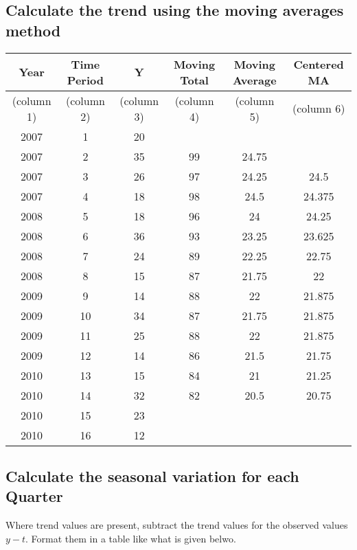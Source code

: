 \documentclass[a4paper,12pt]{article}
\begin{document}
\subsection*{Calculate the trend using the moving averages method}

\begin{tabular}{|c|c|c|c|c|c|} 
	\hline
	Year	&	Time Period	&	Y	&	Moving Total	&	Moving Average	&	Centered MA	\\	\hline
	(column 1)	&	(column 2)	&	(column 3)	&	(column 4)	&	(column 5)	&	(column 6)	\\	\hline
	2007	&	1	&	20	&		&		&		\\	\hline
	2007	&	2	&	35	&	99	&	24.75	&		\\	\hline
	2007	&	3	&	26	&	97	&	24.25	&	24.5	\\	\hline
	2007	&	4	&	18	&	98	&	24.5	&	24.375	\\	\hline
	2008	&	5	&	18	&	96	&	24	&	24.25	\\	\hline
	2008	&	6	&	36	&	93	&	23.25	&	23.625	\\	\hline
	2008	&	7	&	24	&	89	&	22.25	&	22.75	\\	\hline
	2008	&	8	&	15	&	87	&	21.75	&	22	\\	\hline
	2009	&	9	&	14	&	88	&	22	&	21.875	\\	\hline
	2009	&	10	&	34	&	87	&	21.75	&	21.875	\\	\hline
	2009	&	11	&	25	&	88	&	22	&	21.875	\\	\hline
	2009	&	12	&	14	&	86	&	21.5	&	21.75	\\	\hline
	2010	&	13	&	15	&	84	&	21	&	21.25	\\	\hline
	2010	&	14	&	32	&	82	&	20.5	&	20.75	\\	\hline
	2010	&	15	&	23	&		&		&		\\	\hline
	2010	&	16	&	12	&		&		&		\\	\hline
\end{tabular} 


\newpage
\subsection*{Calculate the seasonal variation for each Quarter}
Where trend values are present, subtract the trend values for the observed values $y-t$. Format them in a table like what is given belwo.
\end{document}
